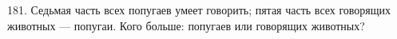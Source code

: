 181. Седьмая часть всех попугаев умеет говорить; пятая часть всех говорящих животных --- попугаи. Кого больше: попугаев или говорящих животных?\\

